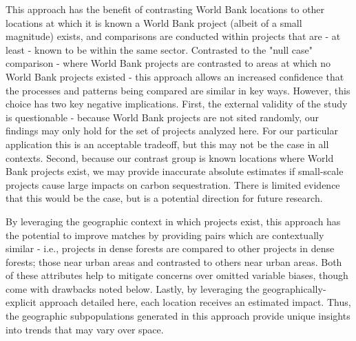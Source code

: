 \documentclass[sustainability,article,submit,moreauthors,pdftex,10pt,a4paper]{mdpi}
\begin{document}
This approach has the benefit of contrasting World Bank locations to other locations at which it is known a World Bank project (albeit of a small magnitude) exists, and comparisons are conducted within projects that are - at least - known to be within the same sector. Contrasted to the "null case" comparison - where World Bank projects are contrasted to areas at which no World Bank projects existed - this approach allows an increased confidence that the processes and patterns being compared are similar in key ways.  However, this choice has two key negative implications.  First, the external validity of the study is questionable - because World Bank projects are not sited randomly, our findings may only hold for the set of projects analyzed here.  For our particular application this is an acceptable tradeoff, but this may not be the case in all contexts.  Second, because our contrast group is known locations where World Bank projects exist, we may provide inaccurate absolute estimates if small-scale projects cause large impacts on carbon sequestration.  There is limited evidence that this would be the case, but is a potential direction for future research. 
\par
By leveraging the geographic context in which projects exist, this approach has the potential to improve matches by providing pairs which are contextually similar - i.e., projects in dense forests are compared to other projects in dense forests; those near urban areas and contrasted to others near urban areas. Both of these attributes help to mitigate concerns over omitted variable biases, though come with drawbacks noted below. Lastly, by leveraging the geographically-explicit approach detailed here, each location receives an estimated impact. Thus, the geographic subpopulations generated in this approach provide unique insights into trends that may vary over space.
\par
\end{document}
